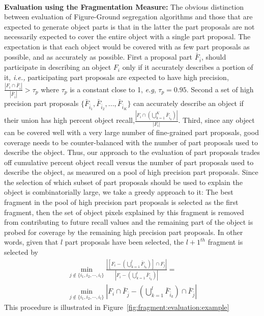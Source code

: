 \noindent\\
{\bf Evaluation using the Fragmentation Measure:} The obvious distinction between evaluation of Figure-Ground segregation algorithms and those that are expected to generate object parts is that in the latter the part proposals are not necessarily expected to cover the entire object with a single part proposal. The expectation is that each object would be covered with as few part proposals as possible, and as accurately as possible. First a proposal part ${\bar F}_{\bar i}$, should participate in describing an object $ {F}_{i}$ only if it accurately describes a portion of it,\textit{ i.e.,} participating part proposals are expected
to have  high precision, $\frac {|F_i\cap {\bar F}_{\bar i}|} {|{\bar F}_{\bar i}|} > \tau_p$ 
where $\tau_p$ is a constant close to 1, \emph{e.g}, $\tau_p=0.95.$
Second a set of high precision part proposals $\{{\bar F}_{{\bar i}_1},{\bar F}_{{\bar i}_2},...,{\bar F}_{{\bar i}_K}\}$ can accurately describe an object if their union has high percent object recall,$\frac {| {F}_{i}\cap(\bigcup_{k=1}^{K}{\bar F}_{{\bar i}_{k}})|} {|{F}_{i}|}$. Third, since any object can be covered well with a very large number of
fine-grained part proposals, good coverage needs to be counter-balanced with
the number of part proposals used to describe the object. Thus, our approach to the evaluation of part proposals trades off cumulative percent object recall
versus the number of part proposals used to describe the object, as measured on a pool of high
precision part proposals. Since the selection of which subset of part proposals should
be used to explain the object is combinatorially large, we take a greedy approach to it: The best fragment in the pool of high precision
part proposals is selected as the first fragment, then the set of object pixels explained
by this fragment is removed from contributing to future recall values and the remaining part of the object is probed
for coverage by the remaining high precision part proposals. In other words, given that $l$
part proposals have been selected, the $l+1^{th}$ fragment is selected by
\begin{equation*}
\begin{split}
\min_{j\not \in\{i_{1},i_2,\cdots,i_l\} }\frac {| [{F}_{i}-(\bigcup_{k=1}^{l}{\bar F}_{{\bar i}_{k}})]\cap F_{j}|} {|F_{i}-(\bigcup_{k=1}^{l}{\bar F}_{{\bar i}_{k}})|} = \\
\min_{j\not \in\{i_{1},i_2,\cdots,i_l\}}  {| {F}_{i}\cap {\bar F}_{\bar j}-(\bigcup_{k=1}^{l}{\bar F}_{{\bar i}_{k}})\cap {\bar F}_{\bar j}|}
\end{split} 
\end{equation*} This procedure is illustrated in Figure~\ref{fig:fragment:evaluation:example}


